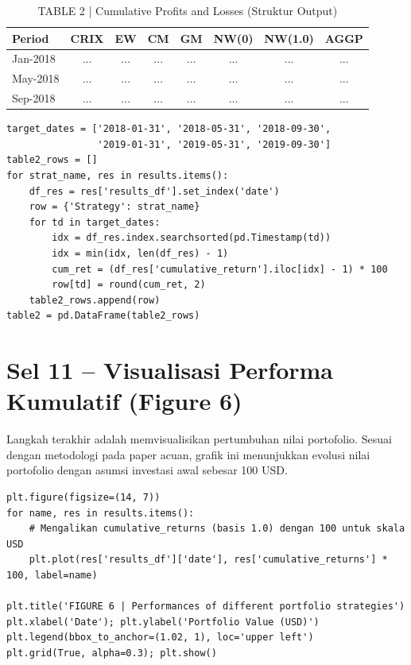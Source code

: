 \documentclass[12pt,a4paper]{article}
\begin{document}
\begin{table}[h]
    \centering
    \footnotesize
    \caption{TABLE 2 | Cumulative Profits and Losses (Struktur Output)}
    \begin{tabular}{lccccccc}
        \toprule
        Period & CRIX & EW & CM & GM & NW(0) & NW(1.0) & AGGP \\
        \midrule
        Jan-2018 & ... & ... & ... & ... & ... & ... & ... \\
        May-2018 & ... & ... & ... & ... & ... & ... & ... \\
        Sep-2018 & ... & ... & ... & ... & ... & ... & ... \\
        \bottomrule
    \end{tabular}
\end{table}

\begin{lstlisting}[caption={Kalkulasi Profit/Loss Kumulatif Periodik (Jan, Mei, Sep)}]
target_dates = ['2018-01-31', '2018-05-31', '2018-09-30', 
                '2019-01-31', '2019-05-31', '2019-09-30']
table2_rows = []
for strat_name, res in results.items():
    df_res = res['results_df'].set_index('date')
    row = {'Strategy': strat_name}
    for td in target_dates:
        idx = df_res.index.searchsorted(pd.Timestamp(td))
        idx = min(idx, len(df_res) - 1)
        cum_ret = (df_res['cumulative_return'].iloc[idx] - 1) * 100
        row[td] = round(cum_ret, 2)
    table2_rows.append(row)
table2 = pd.DataFrame(table2_rows)
\end{lstlisting}

\section{Sel 11 -- Visualisasi Performa Kumulatif (Figure 6)}
Langkah terakhir adalah memvisualisikan pertumbuhan nilai portofolio. Sesuai dengan metodologi pada paper acuan, grafik ini menunjukkan evolusi nilai portofolio dengan asumsi investasi awal sebesar 100 USD.

\begin{lstlisting}[caption={Visualisasi Cumulative Returns (Scale 100 USD)}]
plt.figure(figsize=(14, 7))
for name, res in results.items():
    # Mengalikan cumulative_returns (basis 1.0) dengan 100 untuk skala USD
    plt.plot(res['results_df']['date'], res['cumulative_returns'] * 100, label=name)

plt.title('FIGURE 6 | Performances of different portfolio strategies')
plt.xlabel('Date'); plt.ylabel('Portfolio Value (USD)')
plt.legend(bbox_to_anchor=(1.02, 1), loc='upper left')
plt.grid(True, alpha=0.3); plt.show()
\end{lstlisting}
\end{document}
